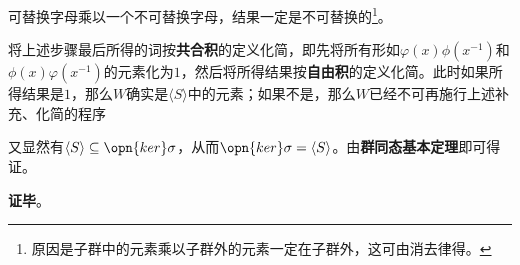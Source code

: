 可替换字母乘以一个不可替换字母，结果一定是不可替换的\footnote{原因是子群中的元素乘以子群外的元素一定在子群外，这可由消去律得。}。

将上述步骤最后所得的词按\textbf{共合积}的定义化简，即先将所有形如$\varphi(x)\phi(x^{-1})$和$\phi(x)\varphi(x^{-1})$的元素化为$1$，然后将所得结果按\textbf{自由积}的定义化简。此时如果所得结果是$1$，那么$W$确实是$\langle S \rangle$中的元素；如果不是，那么$W$已经不可再施行上述补充、化简的程序

又显然有$\langle S \rangle \subseteq \opn{ker}\sigma$，从而$\opn{ker}\sigma=\langle S \rangle$。由\textbf{群同态基本定理}即可得证。

\textbf{证毕}。



















